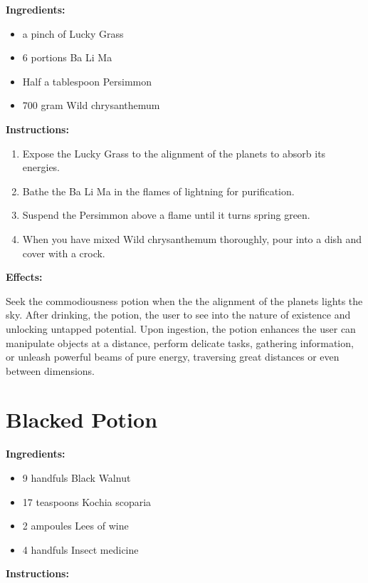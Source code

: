 \documentclass{article}
\begin{document}
\textbf{Ingredients:}

\begin{itemize}
  \item a pinch of Lucky Grass
  \item 6 portions Ba Li Ma
  \item Half a tablespoon Persimmon
  \item 700 gram Wild chrysanthemum
\end{itemize}

\textbf{Instructions:}

\begin{enumerate}
  \item Expose the Lucky Grass to the alignment of the planets to absorb its energies.
  \item Bathe the Ba Li Ma in the flames of lightning for purification.
  \item Suspend the Persimmon above a flame until it turns spring green.
  \item When you have mixed Wild chrysanthemum thoroughly, pour into a dish and cover with a crock.
\end{enumerate}

\textbf{Effects:}

Seek the commodiousness potion when the the alignment of the planets lights the sky. After drinking, the potion, the user to see into the nature of existence and unlocking untapped potential. Upon ingestion, the potion enhances the user can manipulate objects at a distance, perform delicate tasks, gathering information, or unleash powerful beams of pure energy, traversing great distances or even between dimensions.

\newpage
\section*{Blacked Potion}

\textbf{Ingredients:}

\begin{itemize}
  \item 9 handfuls Black Walnut
  \item 17 teaspoons Kochia scoparia
  \item 2 ampoules Lees of wine
  \item 4 handfuls Insect medicine
\end{itemize}

\textbf{Instructions:}
\end{document}
